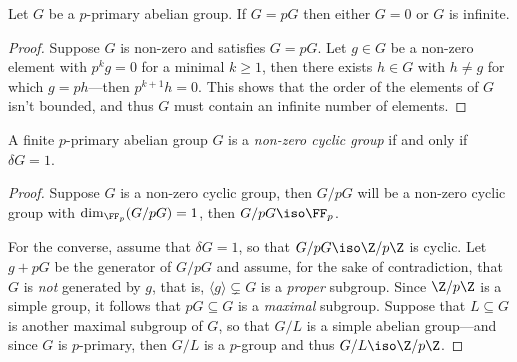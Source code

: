\begin{lemma}
\label{lem:G=pG-for-p-primary-iff-zero-or-infinite}
Let \(G\) be a \(p\)-primary abelian group. If \(G = p G\) then either \(G = 0\)
or \(G\) is infinite.
\end{lemma}

\begin{proof}
Suppose \(G\) is non-zero and satisfies \(G = p G\). Let \(g \in G\) be a
non-zero element with \(p^k g = 0\) for a minimal \(k \geq 1\), then there
exists \(h \in G\) with \(h \neq g\) for which \(g = p h\)---then
\(p^{k+1} h = 0\). This shows that the order of the elements of \(G\) isn't
bounded, and thus \(G\) must contain an infinite number of elements.
\end{proof}

\begin{lemma}
\label{lem:finite-p-primary-is-cyclic-iff-delta-is-one}
A finite \(p\)-primary abelian group \(G\) is a \emph{non-zero cyclic group} if
and only if \(\delta G = 1\).
\end{lemma}

\begin{proof}
Suppose \(G\) is a non-zero cyclic group, then \(G/pG\) will be a non-zero
cyclic group with \(\dim_{\FF_p}(G/pG) = 1\), then \(G/pG \iso \FF_p\).

For the converse, assume that \(\delta G = 1\), so that \(G/pG \iso \Z/p\Z\) is
cyclic. Let \(g + p G\) be the generator of \(G/pG\) and assume, for the sake of
contradiction, that \(G\) is \emph{not} generated by \(g\), that is,
\(\langle g \rangle \subsetneq G\) is a \emph{proper} subgroup. Since \(\Z/p\Z\)
is a simple group, it follows that \(p G \subseteq G\) is a \emph{maximal}
subgroup. Suppose that \(L \subseteq G\) is another maximal subgroup of \(G\),
so that \(G/L\) is a simple abelian group---and since \(G\) is \(p\)-primary,
then \(G/L\) is a \(p\)-group and thus \(G/L \iso \Z/p\Z\).
\end{proof}

